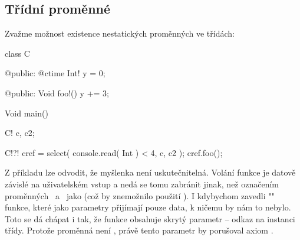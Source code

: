 \subsection{Třídní \ctime proměnné}
Zvažme možnost existence nestatických \ctime proměnných ve třídách:
\begin{code}
class C {
	
@public:
	@ctime Int! y = 0;
	
@public:
	Void foo!() {
		y += 3;
	}
	
}

Void main() {
	C! c, c2;
	
	C!?! cref = select( console.read( Int ) < 4, c, c2 );
	cref.foo();
}
\end{code}

Z příkladu lze odvodit, že myšlenka není uskutečnitelná. Volání funkce  je datově závislé na uživatelském vstup a nedá se tomu zabránit jinak, než označením proměnných ~a~ jako \ctime (což by znemožnilo použití ). I kdybychom zavedli "\ctime" funkce, které jako parametry přijímají pouze \ctime data, k ničemu by nám to nebylo. Toto se dá chápat i tak, že funkce  obsahuje skrytý parametr -- odkaz na instanci třídy. Protože proměnná  není \ctime, právě tento parametr by porušoval axiom \ctime.

